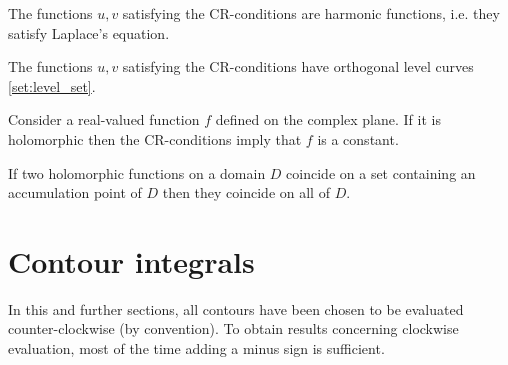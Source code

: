     \begin{property}
        The functions $u,v$ satisfying the CR-conditions are harmonic functions, i.e. they satisfy Laplace's equation.
    \end{property}
    \begin{property}
        The functions $u,v$ satisfying the CR-conditions have orthogonal level curves \ref{set:level_set}.
    \end{property}

    \begin{property}
        Consider a real-valued function $f$ defined on the complex plane. If it is holomorphic then the CR-conditions imply that $f$ is a constant.
    \end{property}

    \begin{theorem}
        If two holomorphic functions on a domain $D$ coincide on a set containing an accumulation point of $D$ then they coincide on all of $D$.
    \end{theorem}

\section{Contour integrals}

    In this and further sections, all contours have been chosen to be evaluated counter-clockwise (by convention). To obtain results concerning clockwise evaluation, most of the time adding a minus sign is sufficient.


